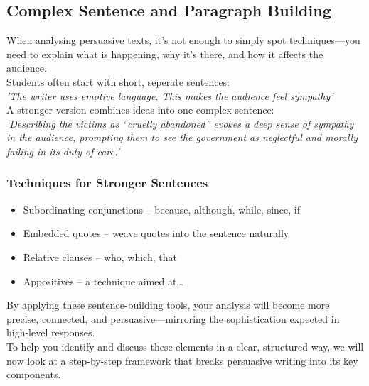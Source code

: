 \documentclass[a4paper]{article}
\begin{document}
\subsection{Complex Sentence and Paragraph Building}

When analysing persuasive texts, it’s not enough to simply spot techniques—you need to explain what is happening, why it’s there, and how it affects the audience.\\

Students often start with short, seperate sentences:\\
\textit{'The writer uses emotive language. This makes the audience feel sympathy'}\\

A stronger version combines ideas into one complex sentence:\\
\textit{‘Describing the victims as “cruelly abandoned” evokes a deep sense of sympathy in the audience, prompting them to see the government as neglectful and morally failing in its duty of care.’}\\

\subsubsection{Techniques for Stronger Sentences}
\begin{itemize}
\item Subordinating conjunctions – because, although, while, since, if
\item Embedded quotes – weave quotes into the sentence naturally
\item Relative clauses – who, which, that
\item Appositives – a technique aimed at…
\end{itemize}

By applying these sentence-building tools, your analysis will become more precise, connected, and persuasive—mirroring the sophistication expected in high-level responses.\\

To help you identify and discuss these elements in a clear, structured way, we will now look at a step-by-step framework that breaks persuasive writing into its key components.\\
\end{document}

